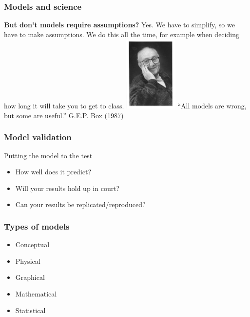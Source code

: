 \documentclass[color=usenames,dvipsnames]{beamer}\usepackage[]{graphicx}\usepackage[]{color}
\begin{document}
\begin{frame}
  \frametitle{Models and science}
  \large
  {\bf But don't models require assumptions?}
  \pause
  \vfill
  Yes. %
  \pause
  \vfill
  We have to simplify, so we have to make assumptions.
  \pause
  \vfill
  We do this all the time, for example when deciding how long it will take you to get to class. 
  \pause
  \vfill
  \includegraphics[width=0.2\textwidth]{figs/Box}
  ``All models are wrong, but some are useful.'' G.E.P. Box (1987)
\end{frame}




\begin{frame}
  \frametitle{Model validation}
  \Large
  {%
    Putting the model to the test}
  \begin{itemize}[<+->]
    \item How well does it predict?
    \item Will your results hold up in court?
    \item Can your results be replicated/reproduced?
  \end{itemize}
\end{frame}






\begin{frame}
  \frametitle{Types of models}
  \Large
  \begin{itemize}
    \item { Conceptual}
    \item Physical
    \item Graphical
    \item {\color<2>{Red} Mathematical}
    \item { Statistical}
  \end{itemize}
\end{frame}
\end{document}
